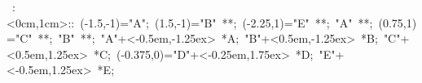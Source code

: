 

\hbox{
\xy    <1cm,0cm>:<0cm,1cm>::
       (-1.5,-1)="A"; (1.5,-1)="B" **\dir{-}; 
       (-2.25,1)="E" **\dir{-}; "A" **\dir{-};
       (0.75,1)="C" **\dir{-}; "B" **\dir{-};
       "A"+<-0.5em,-1.25ex> *{A}; 
       "B"+<0.5em,-1.25ex> *{B}; 
       "C"+<0.5em,1.25ex> *{C}; 
       (-0.375,0)="D"+<-0.25em,1.75ex> *{D}; 
       "E"+<-0.5em,1.25ex> *{E};  
\endxy}
